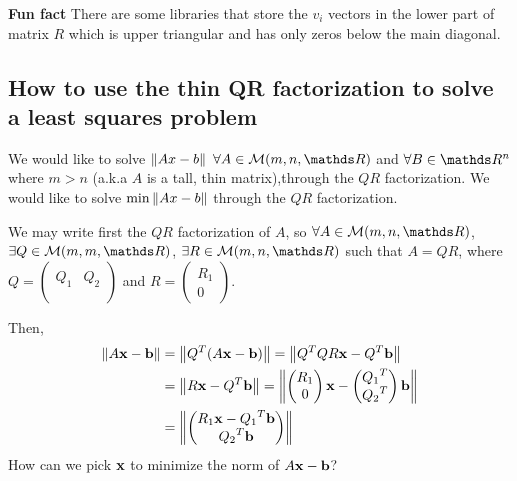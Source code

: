 \documentclass[computationalMathematics.tex]{subfiles}
\begin{document}
\begin{myframe}{\bf Fun fact}
There are some libraries that store the $v_{i}$ vectors in the lower part of matrix $R$ which is upper triangular and has only zeros below the main diagonal.
\end{myframe}

\subsection{How to use the thin QR factorization to solve a least squares problem}

We would like to solve $\left\lVert Ax-b\right\rVert$ $\forall A \in \mathcal{M}(m, n, \R)$ and $\forall B \in \R^n$ where $m > n$ (a.k.a $A$ is a tall, thin matrix),through the $QR$ factorization.
We would like to solve $\min \left\lVert Ax-b\right\rVert$ through the $QR$ factorization.

We may write first the $QR$ factorization of $A$, so $\forall A \in \mathcal{M}(m, n, \R)$, $\exists Q \in \mathcal{M}(m, m, \R)$, $\exists R \in \mathcal{M}(m, n, \R)$ such that $A = QR$, where 
$Q = \begin{pmatrix}
  &\\
  Q_1 & Q_2\\
  &\\
\end{pmatrix}$ and $R = \begin{pmatrix}
    R_1\\0
\end{pmatrix}$.

Then, 
\begin{equation}
\begin{aligned}
  \left\lVert A\mathbf{x}-\mathbf{b}\right\rVert &= \left\lVert{Q}^{T}(A\mathbf{x}-\mathbf{b})\right\rVert = \left\lVert{Q}^{T}QR\mathbf{x} - {Q}^{T}\mathbf{b}\right\rVert \\
  & = \left\lVert R\mathbf{x}-{Q}^{T}\mathbf{b}\right\rVert = \left\lVert\begin{pmatrix}
    R_1\\0
\end{pmatrix}\mathbf{x} - \begin{pmatrix}
  {Q_{1}}^{T}\\
    {Q_{2}}^{T}
\end{pmatrix}\mathbf{b}\right\rVert\\
&=\left\lVert\begin{pmatrix}
  R_{1} \mathbf{x} - {Q_{1}}^{T} \mathbf{b}\\
    {Q_{2}}^{T}\mathbf{b}
\end{pmatrix}\right\rVert
\end{aligned}
\end{equation}
How can we pick $\mathbf{x}$ to minimize the norm of $A\mathbf{x} - \mathbf{b}$?
\end{document}
